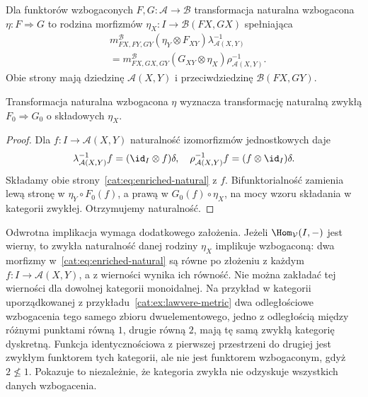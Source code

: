 \begin{definicja}\label{cat:def:enriched-natural}
Dla funktorów wzbogaconych $F,G:\mathcal A\to\mathcal B$ transformacja naturalna wzbogacona $\eta:F\Rightarrow G$ to rodzina morfizmów $\eta_X:I\to\mathcal B(FX,GX)$ spełniająca
\begin{equation}\label{cat:eq:enriched-natural}
\begin{aligned}
 &m^{\mathcal B}_{FX,FY,GY}(\eta_Y\otimes F_{XY})
 \lambda_{\mathcal A(X,Y)}^{-1}\\
 &=m^{\mathcal B}_{FX,GX,GY}(G_{XY}\otimes\eta_X)
 \rho_{\mathcal A(X,Y)}^{-1}.
\end{aligned}
\end{equation}
Obie strony mają dziedzinę $\mathcal A(X,Y)$ i przeciwdziedzinę $\mathcal B(FX,GY)$.
\end{definicja}

\begin{stwierdzenie}\label{cat:prop:enriched-natural-underlying}
Transformacja naturalna wzbogacona $\eta$ wyznacza transformację naturalną zwykłą $F_0\Rightarrow G_0$ o składowych $\eta_X$.
\end{stwierdzenie}
\begin{proof}
Dla $f:I\to\mathcal A(X,Y)$ naturalność izomorfizmów jednostkowych daje
\[
 \lambda_{\mathcal A(X,Y)}^{-1}f=(\id_I\otimes f)\delta,\quad
 \rho_{\mathcal A(X,Y)}^{-1}f=(f\otimes\id_I)\delta.
\]
Składamy obie strony~\eqref{cat:eq:enriched-natural} z $f$. Bifunktorialność zamienia lewą stronę w $\eta_Y\circ F_0(f)$, a prawą w $G_0(f)\circ\eta_X$, na mocy wzoru składania w kategorii zwykłej. Otrzymujemy naturalność.
\end{proof}

\begin{uwaga}
Odwrotna implikacja wymaga dodatkowego założenia. Jeżeli $\Hom_{\mathcal V}(I,-)$ jest wierny, to zwykła naturalność danej rodziny $\eta_X$ implikuje wzbogaconą: dwa morfizmy w~\eqref{cat:eq:enriched-natural} są równe po złożeniu z każdym $f:I\to\mathcal A(X,Y)$, a z wierności wynika ich równość. Nie można zakładać tej wierności dla dowolnej kategorii monoidalnej. Na przykład w kategorii uporządkowanej z przykładu~\ref{cat:ex:lawvere-metric} dwa odległościowe wzbogacenia tego samego zbioru dwuelementowego, jedno z odległością między różnymi punktami równą $1$, drugie równą $2$, mają tę samą zwykłą kategorię dyskretną. Funkcja identycznościowa z pierwszej przestrzeni do drugiej jest zwykłym funktorem tych kategorii, ale nie jest funktorem wzbogaconym, gdyż $2\not\leq1$. Pokazuje to niezależnie, że kategoria zwykła nie odzyskuje wszystkich danych wzbogacenia.
\end{uwaga}


